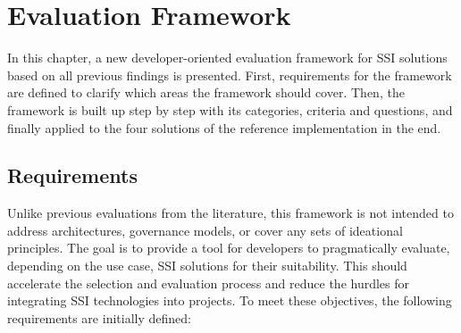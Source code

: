 \chapter{Evaluation Framework}\label{chapter: framework}
    
    In this chapter, a new developer-oriented evaluation framework for \ac{SSI} solutions based on all previous findings is presented. First, requirements for the framework are defined to clarify which areas the framework should cover. Then, the framework is built up step by step with its categories, criteria and questions, and finally applied to the four solutions of the reference implementation in the end. 
    
	\section{Requirements}\label{section: framework requirements}
	
	Unlike previous evaluations from the literature, this framework is not intended to address architectures, governance models, or cover any sets of ideational principles. The goal is to provide a tool for developers to pragmatically evaluate, depending on the use case, \ac{SSI} solutions for their suitability. This should accelerate the selection and evaluation process and reduce the hurdles for integrating \ac{SSI} technologies into projects. To meet these objectives, the following requirements are initially defined:
	
